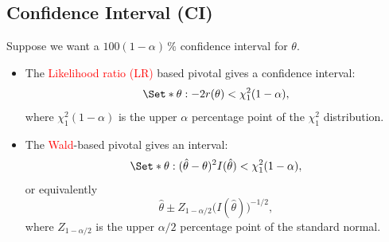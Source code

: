 \documentclass{article}\usepackage[]{graphicx}\usepackage[svgnames]{xcolor}
\begin{document}
\subsection*{Confidence Interval (CI)}
Suppose we want a $ 100(1-\alpha)\, \% $ confidence interval for $ \theta $.
\begin{itemize}
      \item The \textcolor{Red}{Likelihood ratio (LR)} based pivotal gives a confidence interval:
            \[ \Set*{\theta:-2r(\theta)<\chi^2_{1}(1-\alpha)}, \]
            where $ \chi^2_1(1-\alpha) $ is the upper $ \alpha $ percentage point of the $ \chi^2_1 $ distribution.
      \item The \textcolor{Red}{Wald}-based pivotal gives an interval:
            \[ \Set*{\theta:(\hat{\theta}-\theta)^2 I(\hat{\theta})<\chi^2_1(1-\alpha)}, \]
            or equivalently
            \[ \hat{\theta}\pm Z_{1-\alpha/2}\bigl(I(\hat{\theta})\bigr)^{-1/2}, \]
            where $ Z_{1-\alpha/2} $ is the upper $ \alpha/2 $ percentage point of the standard normal.
\end{itemize}
\end{document}
